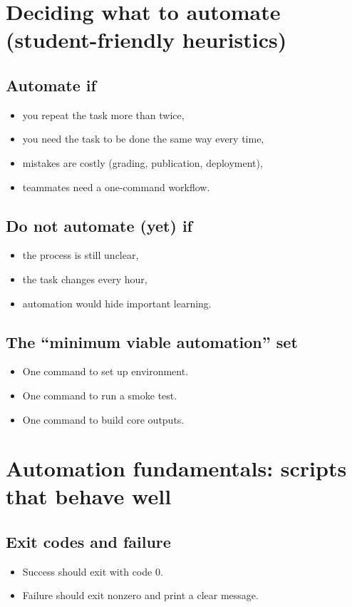 \section{Deciding what to automate (student-friendly heuristics)}
\subsection{Automate if}
\begin{itemize}
\item you repeat the task more than twice,
\item you need the task to be done the same way every time,
\item mistakes are costly (grading, publication, deployment),
\item teammates need a one-command workflow.
\end{itemize}

\subsection{Do not automate (yet) if}
\begin{itemize}
\item the process is still unclear,
\item the task changes every hour,
\item automation would hide important learning.
\end{itemize}

\subsection{The ``minimum viable automation'' set}
\begin{itemize}
\item One command to set up environment.
\item One command to run a smoke test.
\item One command to build core outputs.
\end{itemize}

\section{Automation fundamentals: scripts that behave well}
\subsection{Exit codes and failure}
\begin{itemize}
\item Success should exit with code 0.
\item Failure should exit nonzero and print a clear message.
\end{itemize}

